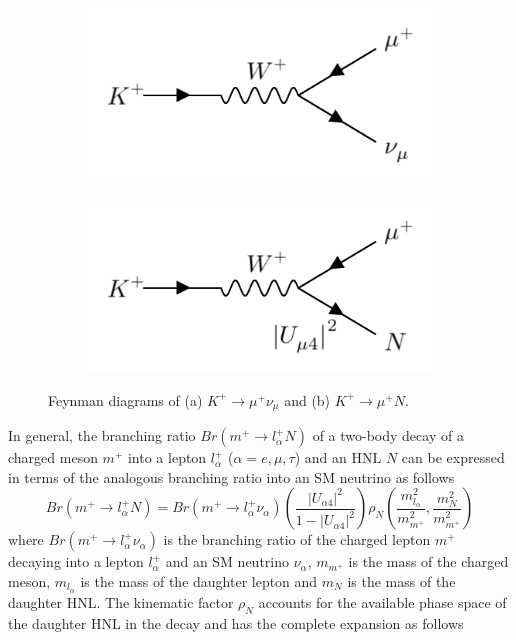 \begin{figure}[ht!]
\begin{subfigure}[h]{0.4\linewidth}
\centering    
\includegraphics[width=\linewidth]{K_to_nu}
\caption{}
\label{fig:kaonnu}
\end{subfigure}
\hfill
\begin{subfigure}[h]{0.4\linewidth}
\centering    
\includegraphics[width=\linewidth]{K_to_HNL}
\caption{}
\label{fig:kaonhnl}
\end{subfigure}%
\caption[Neutrino and Heavy Neutral Lepton Production Feynman Diagrams]
{
	Feynman diagrams of (a) $K^+ \rightarrow \mu^+ \nu_{\mu}$ and (b) $K^+ \rightarrow \mu^+ N$.%
}
\end{figure}

In general, the branching ratio $Br(m^+\rightarrow l^{+}_{\alpha}N)$ of a two-body decay of a charged meson $m^+$ into a lepton $l^{+}_{\alpha}$ ($\alpha=e,\mu,\tau$) and an HNL $N$ can be expressed in terms of the analogous branching ratio into an SM neutrino as follows \cite{HNLKelly}
\begin{equation}
	\label{eq:kaon_decay_hnl}
	Br(m^+\rightarrow l^{+}_{\alpha}N) = Br(m^+\rightarrow l^{+}_{\alpha}\nu_{\alpha})\left(\frac{|U_{\alpha 4}|^{2}}{1 - |U_{\alpha 4}|^{2}}\right)\rho_{N}\left(\frac{m^{2}_{l_{\alpha}}}{m^{2}_{m^+}}, \frac{m^{2}_{N}}{m^{2}_{m^+}} \right) 
\end{equation}
where $Br(m^+\rightarrow l^{+}_{\alpha}\nu_{\alpha})$ is the branching ratio of the charged lepton $m^+$ decaying into a lepton $l^+_{\alpha}$ and an SM neutrino $\nu_{\alpha}$, $m_{m^+}$ is the mass of the charged meson, $m_{l_{\alpha}}$ is the mass of the daughter lepton and $m_{N}$ is the mass of the daughter HNL.
The kinematic factor $\rho_{N}$ accounts for the available phase space of the daughter HNL in the decay and has the complete expansion as follows \cite{HNLKelly}

